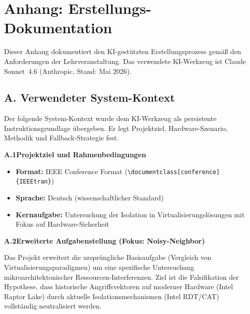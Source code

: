\documentclass[conference]{IEEEtran}
\begin{document}



\clearpage
\onecolumn

\section*{Anhang: Erstellungs-Dokumentation}

\noindent
Dieser Anhang dokumentiert den KI-gestützten Erstellungsprozess gemäß
den Anforderungen der Lehrveranstaltung. Das verwendete KI-Werkzeug
ist Claude Sonnet~4.6 (Anthropic, Stand: Mai 2026).

\subsection*{A. Verwendeter System-Kontext}

\noindent
Der folgende System-Kontext wurde dem KI-Werkzeug als persistente
Instruktionsgrundlage übergeben. Er legt Projektziel, Hardware-Szenario,
Methodik und Fallback-Strategie fest.

\bigskip
\noindent\textbf{A.1\quad Projektziel und Rahmenbedingungen}

\begin{itemize}
  \item \textbf{Format:} IEEE Conference Format
        (\texttt{\textbackslash documentclass[conference]\{IEEEtran\}})
  \item \textbf{Sprache:} Deutsch (wissenschaftlicher Standard)
  \item \textbf{Kernaufgabe:} Untersuchung der Isolation in
        Virtualisierungslösungen mit Fokus auf Hardware-Sicherheit
\end{itemize}

\bigskip
\noindent\textbf{A.2\quad Erweiterte Aufgabenstellung (Fokus: Noisy-Neighbor)}

Das Projekt erweitert die ursprüngliche Basisaufgabe (Vergleich von
Virtualisierungsparadigmen) um eine spezifische Untersuchung
mikroarchitektonischer Ressourcen-Interferenzen. Ziel ist die Falsifikation
der Hypothese, dass historische Angriffsvektoren auf moderner Hardware
(Intel Raptor Lake) durch aktuelle Isolationsmechanismen
(Intel RDT/CAT) vollständig neutralisiert werden.
\end{document}
